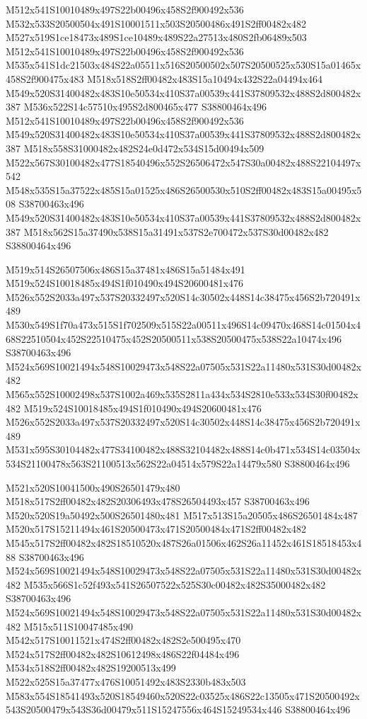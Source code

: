 \documentclass{article}
\begin{document}
\begin{multicols}{2}
M512x541S10010489x497S22b00496x458S2f900492x536 M532x533S20500504x491S10001511x503S20500486x491S2ff00482x482 M527x519S1ce18473x489S1ce10489x489S22a27513x480S2fb06489x503 M512x541S10010489x497S22b00496x458S2f900492x536 M535x541S1dc21503x484S22a05511x516S20500502x507S20500525x530S15a01465x458S2f900475x483 M518x518S2ff00482x483S15a10494x432S22a04494x464 M549x520S31400482x483S10e50534x410S37a00539x441S37809532x488S2d800482x387 M536x522S14c57510x495S2d800465x477 S38800464x496 M512x541S10010489x497S22b00496x458S2f900492x536 M549x520S31400482x483S10e50534x410S37a00539x441S37809532x488S2d800482x387 M518x558S31000482x482S24e0d472x534S15d00494x509 M522x567S30100482x477S18540496x552S26506472x547S30a00482x488S22104497x542 M548x535S15a37522x485S15a01525x486S26500530x510S2ff00482x483S15a00495x508 S38700463x496 M549x520S31400482x483S10e50534x410S37a00539x441S37809532x488S2d800482x387 M518x562S15a37490x538S15a31491x537S2e700472x537S30d00482x482 S38800464x496

M519x514S26507506x486S15a37481x486S15a51484x491 M519x524S10018485x494S1f010490x494S20600481x476 M526x552S2033a497x537S20332497x520S14c30502x448S14c38475x456S2b720491x489 M530x549S1f70a473x515S1f702509x515S22a00511x496S14c09470x468S14c01504x468S22510504x452S22510475x452S20500511x538S20500475x538S22a10474x496 S38700463x496 M524x569S10021494x548S10029473x548S22a07505x531S22a11480x531S30d00482x482 M565x552S10002498x537S1002a469x535S2811a434x534S2810e533x534S30f00482x482 M519x524S10018485x494S1f010490x494S20600481x476 M526x552S2033a497x537S20332497x520S14c30502x448S14c38475x456S2b720491x489 M531x595S30104482x477S34100482x488S32104482x488S14c0b471x534S14c03504x534S21100478x563S21100513x562S22a04514x579S22a14479x580 S38800464x496

M521x520S10041500x490S26501479x480 M518x517S2ff00482x482S20306493x478S26504493x457 S38700463x496 M520x520S19a50492x500S26501480x481 M517x513S15a20505x486S26501484x487 M520x517S15211494x461S20500473x471S20500484x471S2ff00482x482 M545x517S2ff00482x482S18510520x487S26a01506x462S26a11452x461S18518453x488 S38700463x496 M524x569S10021494x548S10029473x548S22a07505x531S22a11480x531S30d00482x482 M535x566S1c52f493x541S26507522x525S30c00482x482S35000482x482 S38700463x496 M524x569S10021494x548S10029473x548S22a07505x531S22a11480x531S30d00482x482 M515x511S10047485x490 M542x517S10011521x474S2ff00482x482S2e500495x470 M524x517S2ff00482x482S10612498x486S22f04484x496 M534x518S2ff00482x482S19200513x499 M522x525S15a37477x476S10051492x483S2330b483x503 M583x554S18541493x520S18549460x520S22c03525x486S22c13505x471S20500492x543S20500479x543S36d00479x511S15247556x464S15249534x446 S38800464x496


\end{multicols}
\end{document}
